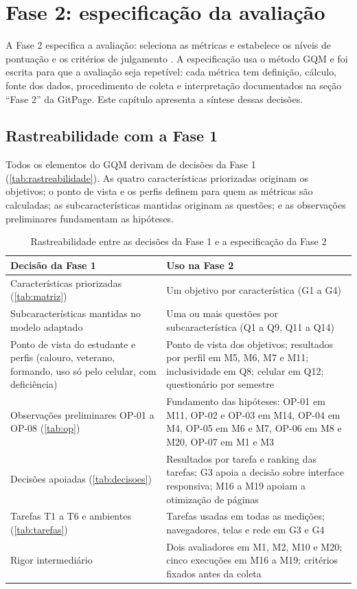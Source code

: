 \chapter{Fase 2: especificação da avaliação}
\label{cap:fase2}

A Fase 2 especifica a avaliação: seleciona as métricas e estabelece os níveis de pontuação e os critérios de julgamento \cite{iso25040,ramos2026processo}. A especificação usa o método GQM \cite{basili1994} e foi escrita para que a avaliação seja repetível: cada métrica tem definição, cálculo, fonte dos dados, procedimento de coleta e interpretação documentados na seção ``Fase 2'' da GitPage. Este capítulo apresenta a síntese dessas decisões.

\section{Rastreabilidade com a Fase 1}
\label{sec:rastreabilidade}

Todos os elementos do GQM derivam de decisões da Fase 1 (\autoref{tab:rastreabilidade}). As quatro características priorizadas originam os objetivos; o ponto de vista e os perfis definem para quem as métricas são calculadas; as subcaracterísticas mantidas originam as questões; e as observações preliminares fundamentam as hipóteses.

\begin{table}[htb]
	\caption{Rastreabilidade entre as decisões da Fase 1 e a especificação da Fase 2}
	\label{tab:rastreabilidade}
	\centering
	\scriptsize
	\begin{tabularx}{\textwidth}{L{5.2cm} Y}
		\toprule
		\textbf{Decisão da Fase 1} & \textbf{Uso na Fase 2} \\
		\midrule
		Características priorizadas (\autoref{tab:matriz}) & Um objetivo por característica (G1 a G4) \\
		Subcaracterísticas mantidas no modelo adaptado & Uma ou mais questões por subcaracterística (Q1 a Q9, Q11 a Q14) \\
		Ponto de vista do estudante e perfis (calouro, veterano, formando, uso só pelo celular, com deficiência) & Ponto de vista dos objetivos; resultados por perfil em M5, M6, M7 e M11; inclusividade em Q8; celular em Q12; questionário por semestre \\
		Observações preliminares OP-01 a OP-08 (\autoref{tab:op}) & Fundamento das hipóteses: OP-01 em M11, OP-02 e OP-03 em M14, OP-04 em M4, OP-05 em M6 e M7, OP-06 em M8 e M20, OP-07 em M1 e M3 \\
		Decisões apoiadas (\autoref{tab:decisoes}) & Resultados por tarefa e ranking das tarefas; G3 apoia a decisão sobre interface responsiva; M16 a M19 apoiam a otimização de páginas \\
		Tarefas T1 a T6 e ambientes (\autoref{tab:tarefas}) & Tarefas usadas em todas as medições; navegadores, telas e rede em G3 e G4 \\
		Rigor intermediário & Dois avaliadores em M1, M2, M10 e M20; cinco execuções em M16 a M19; critérios fixados antes da coleta \\
		\bottomrule
	\end{tabularx}
\end{table}

